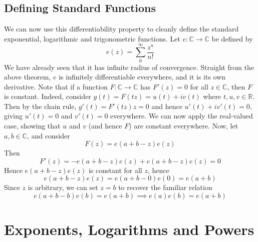 \documentclass{article}
\begin{document}
\subsection{Defining Standard Functions}
We can now use this differentiability property to cleanly define the standard exponential, logarithmic and trigonometric functions. Let $e \colon \mathbb C \to \mathbb C$ be defined by
\[ e(z) = \sum_0^\infty \frac{z^n}{n!} \]
We have already seen that it has infinite radius of convergence. Straight from the above theorem, $e$ is infinitely differentiable everywhere, and it is its own derivative. Note that if a function $F \colon \mathbb C \to \mathbb C$ has $F'(z) = 0$ for all $z \in \mathbb C$, then $F$ is constant. Indeed, consider $g(t) = F(tz) = u(t) + iv(t)$ where $t, u, v \in \mathbb R$. Then by the chain rule, $g'(t) = F'(tz)z = 0$ and hence $u'(t) + iv'(t) = 0$, giving $u'(t) = 0$ and $v'(t) = 0$ everywhere. We can now apply the real-valued case, showing that $u$ and $v$ (and hence $F$) are constant everywhere. Now, let $a, b \in \mathbb C$, and consider
\[ F(z) = e(a + b - z)e(z) \]
Then
\[ F'(z) = -e(a+b-z)e(z) + e(a+b-z)e(z) = 0 \]
Hence $e(a + b - z)e(z)$ is constant for all $z$, hence
\[ e(a + b - z)e(z) = e(a + b - 0)e(0) = e(a + b) \]
Since $z$ is arbitrary, we can set $z=b$ to recover the familiar relation
\[ e(a+b-b)e(b) = e(a+b) \implies e(a)e(b) = e(a+b) \]

\section{Exponents, Logarithms and Powers}
\end{document}
